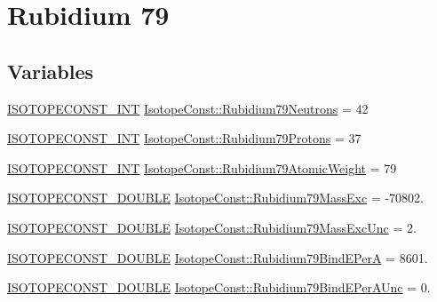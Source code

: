 \hypertarget{group___isotope_const-_rubidium-_rb79}{}\section{Rubidium 79}
\label{group___isotope_const-_rubidium-_rb79}
\subsection*{Variables}
\begin{DoxyCompactItemize}
\item 
\mbox{\hyperlink{group___isotope_const-_macros_ga5f18360b3e99483a35c32d789e62621c}{I\+S\+O\+T\+O\+P\+E\+C\+O\+N\+S\+T\+\_\+\+I\+NT}} \mbox{\hyperlink{group___isotope_const-_rubidium-_rb79_ga689284c32752f8137b6a7a11098403cf}{Isotope\+Const\+::\+Rubidium79\+Neutrons}} = 42
\item 
\mbox{\hyperlink{group___isotope_const-_macros_ga5f18360b3e99483a35c32d789e62621c}{I\+S\+O\+T\+O\+P\+E\+C\+O\+N\+S\+T\+\_\+\+I\+NT}} \mbox{\hyperlink{group___isotope_const-_rubidium-_rb79_ga9c0b4ded203089a1aa485c5c3d090313}{Isotope\+Const\+::\+Rubidium79\+Protons}} = 37
\item 
\mbox{\hyperlink{group___isotope_const-_macros_ga5f18360b3e99483a35c32d789e62621c}{I\+S\+O\+T\+O\+P\+E\+C\+O\+N\+S\+T\+\_\+\+I\+NT}} \mbox{\hyperlink{group___isotope_const-_rubidium-_rb79_ga04f17723550f58dd301a28ba2ac47d99}{Isotope\+Const\+::\+Rubidium79\+Atomic\+Weight}} = 79
\item 
\mbox{\hyperlink{group___isotope_const-_macros_ga8f45a7272ce02c0b4c65c44636ed719a}{I\+S\+O\+T\+O\+P\+E\+C\+O\+N\+S\+T\+\_\+\+D\+O\+U\+B\+LE}} \mbox{\hyperlink{group___isotope_const-_rubidium-_rb79_ga61f52b9ae2b86614b2927181d285d306}{Isotope\+Const\+::\+Rubidium79\+Mass\+Exc}} = -\/70802.
\item 
\mbox{\hyperlink{group___isotope_const-_macros_ga8f45a7272ce02c0b4c65c44636ed719a}{I\+S\+O\+T\+O\+P\+E\+C\+O\+N\+S\+T\+\_\+\+D\+O\+U\+B\+LE}} \mbox{\hyperlink{group___isotope_const-_rubidium-_rb79_gab64926ed83ce7a344f67e7118108f5e8}{Isotope\+Const\+::\+Rubidium79\+Mass\+Exc\+Unc}} = 2.
\item 
\mbox{\hyperlink{group___isotope_const-_macros_ga8f45a7272ce02c0b4c65c44636ed719a}{I\+S\+O\+T\+O\+P\+E\+C\+O\+N\+S\+T\+\_\+\+D\+O\+U\+B\+LE}} \mbox{\hyperlink{group___isotope_const-_rubidium-_rb79_ga5dcb18877c834856c6f2be5d56c49ecd}{Isotope\+Const\+::\+Rubidium79\+Bind\+E\+PerA}} = 8601.
\item 
\mbox{\hyperlink{group___isotope_const-_macros_ga8f45a7272ce02c0b4c65c44636ed719a}{I\+S\+O\+T\+O\+P\+E\+C\+O\+N\+S\+T\+\_\+\+D\+O\+U\+B\+LE}} \mbox{\hyperlink{group___isotope_const-_rubidium-_rb79_gafd1bf27048004e4cc2d81246c38fa2b7}{Isotope\+Const\+::\+Rubidium79\+Bind\+E\+Per\+A\+Unc}} = 0.

\end{DoxyCompactItemize}
